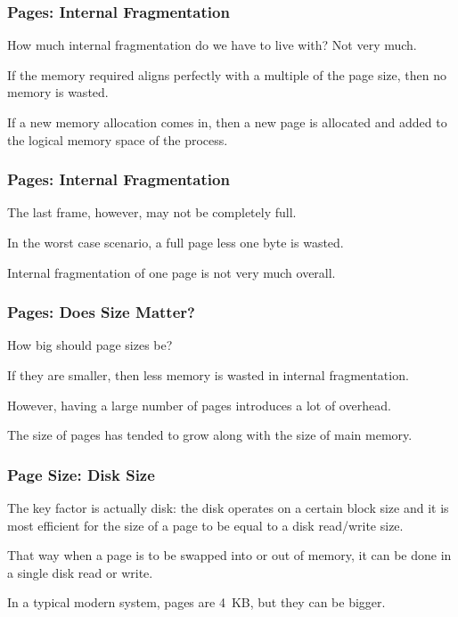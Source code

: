 \begin{frame}
\frametitle{Pages: Internal Fragmentation}

How much internal fragmentation do we have to live with? Not very much. 

If the memory required aligns perfectly with a multiple of the page size, then no memory is wasted. 

If a new memory allocation comes in, then a new page is allocated and added to the logical memory space of the process. 

\end{frame}

\begin{frame}
\frametitle{Pages: Internal Fragmentation}

The last frame, however, may not be completely full. 

In the worst case scenario, a full page less one byte is wasted. 

Internal fragmentation of one page is not very much overall.


\end{frame}

\begin{frame}
\frametitle{Pages: Does Size Matter?}

How big should page sizes be? 

If they are smaller, then less memory is wasted in internal fragmentation. 

However, having a large number of pages introduces a lot of overhead. 

The size of pages has tended to grow along with the size of main memory.

\end{frame}

\begin{frame}
\frametitle{Page Size: Disk Size}

The key factor is actually disk: the disk operates on a certain block size and it is most efficient for the size of a page to be equal to a disk read/write size. 

That way when a page is to be swapped into or out of memory, it can be done in a single disk read or write. 

In a typical modern system, pages are 4~KB, but they can be bigger.

\end{frame}

